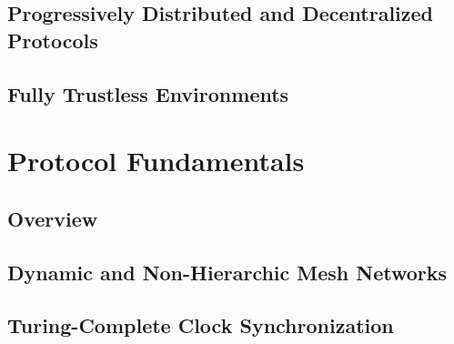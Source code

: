 

\subsection{Progressively Distributed and Decentralized Protocols} \label{sec:related-work-distributed-decentralized}



\subsection{Fully Trustless Environments} \label{sec:related-work-fully-trustless}




% 

\newpage
\section{Protocol Fundamentals} \label{sec:protocol-fundamentals}



\subsection{Overview} \label{sec:protocol-fundamentals-overview}



\subsection{Dynamic and Non-Hierarchic Mesh Networks} \label{sec:protocol-fundamentals-mesh}



\subsection{Turing-Complete Clock Synchronization} \label{sec:protocol-fundamentals-clock}

